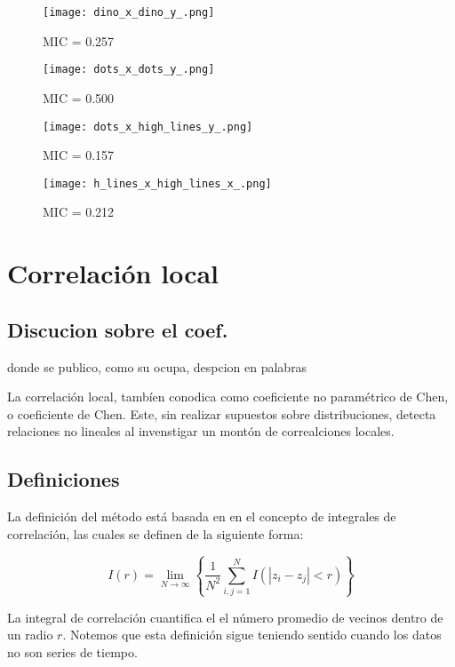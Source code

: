		\begin{figure}[H]
		\centering
		\texttt{[image: dino\_x\_dino\_y\_.png]}
		\caption{ MIC = 0.257}
		\end{figure}
		
		\begin{figure}[H]
		\centering
		\texttt{[image: dots\_x\_dots\_y\_.png]}
		\caption{ MIC = 0.500}
		\end{figure}
		
		\begin{figure}[H]
		\centering
		\texttt{[image: dots\_x\_high\_lines\_y\_.png]}
		\caption{ MIC = 0.157}
		\end{figure}
		
		\begin{figure}[H]
		\centering
		\texttt{[image: h\_lines\_x\_high\_lines\_x\_.png]}
		\caption{ MIC = 0.212}
		\end{figure}

		
\section[]{Correlaci\'on local} 


	\subsection{Discucion sobre el coef.}

	donde se publico, como su ocupa, despcion en palabras

	La correlaci\'on local, tamb\'ien conodica como coeficiente no param\'etrico de Chen, o coeficiente de Chen. Este, sin realizar supuestos sobre distribuciones, detecta relaciones no lineales al invenstigar un mont\'on de correalciones locales. 

	\subsection{Definiciones}

	La definici\'on del m\'etodo est\'a basada en en el concepto de integrales de correlaci\'on, las cuales se definen de la siguiente forma:
	\begin{defn}
		$$
		I(r)=\lim _{N \rightarrow \infty}\left\{\frac{1}{N^{2}} \sum_{i, j=1}^{N} I\left(\left|z_{i}-z_{j}\right|<r\right)\right\}
		$$
	\end{defn}
	La integral de correlaci\'on cuantifica el el n\'umero promedio de vecinos dentro de un radio $r$. Notemos que esta definici\'on sigue teniendo sentido cuando los datos no son series de tiempo.

